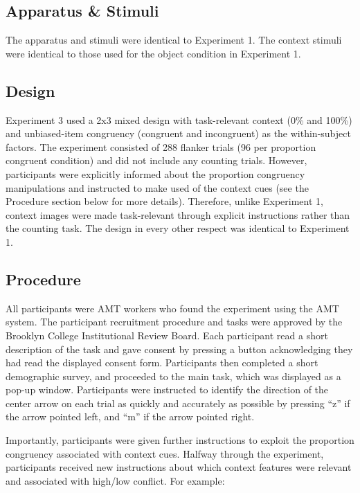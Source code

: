 \documentclass[english,,man,floatsintext]{apa6}
\begin{document}
\hypertarget{apparatus-stimuli-2}{%
\subsection{Apparatus \& Stimuli}\label{apparatus-stimuli-2}}

The apparatus and stimuli were identical to Experiment 1. The context stimuli were identical to those used for the object condition in Experiment 1.

\hypertarget{design-2}{%
\subsection{Design}\label{design-2}}

Experiment 3 used a 2x3 mixed design with task-relevant context (0\% and 100\%) and unbiased-item congruency (congruent and incongruent) as the within-subject factors. The experiment consisted of 288 flanker trials (96 per proportion congruent condition) and did not include any counting trials. However, participants were explicitly informed about the proportion congruency manipulations and instructed to make used of the context cues (see the Procedure section below for more details). Therefore, unlike Experiment 1, context images were made task-relevant through explicit instructions rather than the counting task. The design in every other respect was identical to Experiment 1.

\hypertarget{procedure-2}{%
\subsection{Procedure}\label{procedure-2}}

All participants were AMT workers who found the experiment using the AMT system. The participant recruitment procedure and tasks were approved by the Brooklyn College Institutional Review Board. Each participant read a short description of the task and gave consent by pressing a button acknowledging they had read the displayed consent form. Participants then completed a short demographic survey, and proceeded to the main task, which was displayed as a pop-up window. Participants were instructed to identify the direction of the center arrow on each trial as quickly and accurately as possible by pressing \enquote{z} if the arrow pointed left, and \enquote{m} if the arrow pointed right.

Importantly, participants were given further instructions to exploit the proportion congruency associated with context cues. Halfway through the experiment, participants received new instructions about which context features were relevant and associated with high/low conflict. For example:
\end{document}
